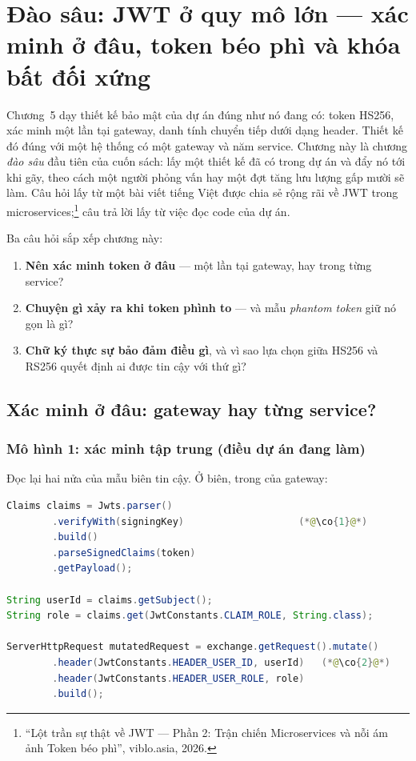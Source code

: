 \chapter{Đào sâu: JWT ở quy mô lớn --- xác minh ở đâu, token béo phì và khóa bất đối xứng}
\label{ch:jwt-scale}

Chương~5 dạy thiết kế bảo mật của dự án đúng như nó đang có: token
HS256, xác minh một lần tại gateway, danh tính chuyển tiếp dưới dạng
header. Thiết kế đó đúng với một hệ thống có một gateway và năm service.
Chương này là chương \emph{đào sâu} đầu tiên của cuốn sách: lấy một thiết
kế đã có trong dự án và đẩy nó tới khi gãy, theo cách một người phỏng vấn
hay một đợt tăng lưu lượng gấp mười sẽ làm. Câu hỏi lấy từ một bài viết
tiếng Việt được chia sẻ rộng rãi về JWT trong
microservices;\footnote{``Lột trần sự thật về JWT --- Phần 2: Trận chiến
Microservices và nỗi ám ảnh Token béo phì'', viblo.asia, 2026.} câu trả
lời lấy từ việc đọc code của dự án.

Ba câu hỏi sắp xếp chương này:

\begin{enumerate}
  \item \textbf{Nên xác minh token ở đâu} --- một lần tại gateway, hay
  trong từng service?
  \item \textbf{Chuyện gì xảy ra khi token phình to} --- và mẫu
  \emph{phantom token} giữ nó gọn là gì?
  \item \textbf{Chữ ký thực sự bảo đảm điều gì}, và vì sao lựa chọn
  giữa HS256 và RS256 quyết định ai được tin cậy với thứ gì?
\end{enumerate}

\section{Xác minh ở đâu: gateway hay từng service?}
\label{sec:where-to-verify}

\subsection{Mô hình 1: xác minh tập trung (điều dự án đang làm)}

Đọc lại hai nửa của mẫu biên tin cậy. Ở biên, trong
 của gateway:

\begin{lstlisting}[language=Java]
Claims claims = Jwts.parser()
        .verifyWith(signingKey)                    (*@\co{1}@*)
        .build()
        .parseSignedClaims(token)
        .getPayload();

String userId = claims.getSubject();
String role = claims.get(JwtConstants.CLAIM_ROLE, String.class);

ServerHttpRequest mutatedRequest = exchange.getRequest().mutate()
        .header(JwtConstants.HEADER_USER_ID, userId)   (*@\co{2}@*)
        .header(JwtConstants.HEADER_USER_ROLE, role)
        .build();
\end{lstlisting}

